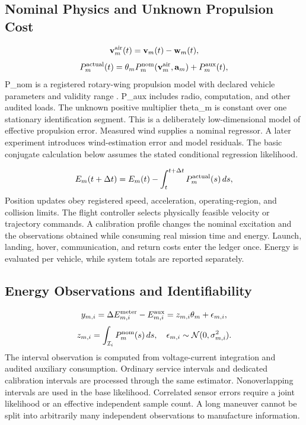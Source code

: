 \documentclass[10pt,twocolumn,letterpaper]{article}
\begin{document}
\subsection{Nominal Physics and Unknown Propulsion Cost}
\begin{equation}
\mathbf v_m^{\rm air}(t)=\mathbf v_m(t)-\mathbf w_m(t),
\end{equation}
\begin{equation}
P_m^{\rm actual}(t)=\theta_m P_m^{\rm nom}(\mathbf v_m^{\rm air},\mathbf a_m)+P_m^{\rm aux}(t),
\end{equation}
P\_nom is a registered rotary-wing propulsion model with declared vehicle parameters and validity range \cite{dai2024wind}. P\_aux includes radio, computation, and other audited loads. The unknown positive multiplier theta\_m is constant over one stationary identification segment. This is a deliberately low-dimensional model of effective propulsion error. Measured wind supplies a nominal regressor. A later experiment introduces wind-estimation error and model residuals. The basic conjugate calculation below assumes the stated conditional regression likelihood.

\begin{equation}
E_m(t+\Delta t)=E_m(t)-\int_t^{t+\Delta t}P_m^{\rm actual}(s)\,ds,
\end{equation}
Position updates obey registered speed, acceleration, operating-region, and collision limits. The flight controller selects physically feasible velocity or trajectory commands. A calibration profile changes the nominal excitation and the observations obtained while consuming real mission time and energy. Launch, landing, hover, communication, and return costs enter the ledger once. Energy is evaluated per vehicle, while system totals are reported separately.

\subsection{Energy Observations and Identifiability}
\begin{equation}
y_{m,i}=\Delta E_{m,i}^{\rm meter}-E_{m,i}^{\rm aux}=z_{m,i}\theta_m+\epsilon_{m,i},
\end{equation}
\begin{equation}
z_{m,i}=\int_{\mathcal I_i}P_m^{\rm nom}(s)\,ds,\quad \epsilon_{m,i}\sim\mathcal N(0,\sigma_{m,i}^2).
\end{equation}
The interval observation is computed from voltage-current integration and audited auxiliary consumption. Ordinary service intervals and dedicated calibration intervals are processed through the same estimator. Nonoverlapping intervals are used in the base likelihood. Correlated sensor errors require a joint likelihood or an effective independent sample count. A long maneuver cannot be split into arbitrarily many independent observations to manufacture information.
\end{document}
